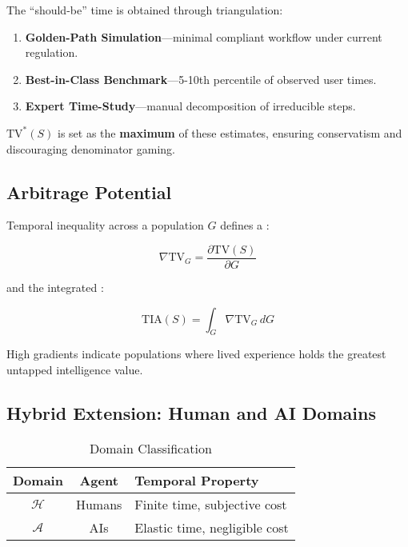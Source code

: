 The ``should-be'' time is obtained through triangulation:

\begin{enumerate}
    \item \textbf{Golden-Path Simulation}—minimal compliant workflow under current regulation.
    \item \textbf{Best-in-Class Benchmark}—5-10th percentile of observed user times.
    \item \textbf{Expert Time-Study}—manual decomposition of irreducible steps.
\end{enumerate}

$\text{TV}^*(S)$ is set as the \textbf{maximum} of these estimates, ensuring conservatism and discouraging denominator gaming.

\subsection{Arbitrage Potential}
\label{sec:arbitrage-potential}

Temporal inequality across a population $G$ defines a :

\begin{equation}
\label{eq:tv-gradient}
\nabla \text{TV}_G = \frac{\partial \text{TV}(S)}{\partial G}
\end{equation}

and the integrated :

\begin{equation}
\label{eq:tia}
\text{TIA}(S) = \int_G \nabla \text{TV}_G \, dG
\end{equation}

High gradients indicate populations where lived experience holds the greatest untapped intelligence value.

\subsection{Hybrid Extension: Human and AI Domains}
\label{sec:hybrid-extension}

\begin{table}[h]
\centering
\caption{Domain Classification}
\label{tab:domains}
\begin{tabular}{ccl}
\toprule
\textbf{Domain} & \textbf{Agent} & \textbf{Temporal Property} \\
\midrule
$\mathcal{H}$ & Humans & Finite time, subjective cost \\
$\mathcal{A}$ & AIs & Elastic time, negligible cost \\
\bottomrule
\end{tabular}
\end{table}

